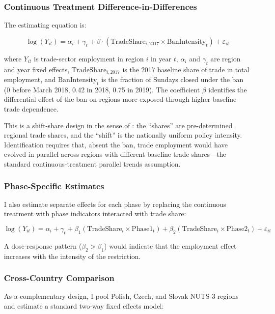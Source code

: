 \documentclass[12pt]{article}
\begin{document}
\subsubsection*{Continuous Treatment Difference-in-Differences} The estimating equation is:

\begin{equation}
\log(Y_{it}) = \alpha_i + \gamma_t + \beta \cdot (\text{TradeShare}_{i,2017} \times \text{BanIntensity}_t) + \varepsilon_{it}
\label{eq:main}
\end{equation}

\noindent where $Y_{it}$ is trade-sector employment in region $i$ in year $t$, $\alpha_i$ and $\gamma_t$ are region and year fixed effects, $\text{TradeShare}_{i,2017}$ is the 2017 baseline share of trade in total employment, and $\text{BanIntensity}_t$ is the fraction of Sundays closed under the ban (0 before March 2018, 0.42 in 2018, 0.75 in 2019). The coefficient $\beta$ identifies the differential effect of the ban on regions more exposed through higher baseline trade dependence.

This is a shift-share design in the sense of \citet{BorusyakHullJaravelEconometrica2022}: the ``shares'' are pre-determined regional trade shares, and the ``shift'' is the nationally uniform policy intensity. Identification requires that, absent the ban, trade employment would have evolved in parallel across regions with different baseline trade shares---the standard continuous-treatment parallel trends assumption.

\subsubsection*{Phase-Specific Estimates} I also estimate separate effects for each phase by replacing the continuous treatment with phase indicators interacted with trade share:

\begin{equation}
\log(Y_{it}) = \alpha_i + \gamma_t + \beta_1 (\text{TradeShare}_i \times \text{Phase1}_t) + \beta_2 (\text{TradeShare}_i \times \text{Phase2}_t) + \varepsilon_{it}
\label{eq:phase}
\end{equation}

A dose-response pattern ($\beta_2 > \beta_1$) would indicate that the employment effect increases with the intensity of the restriction.

\subsubsection*{Cross-Country Comparison} As a complementary design, I pool Polish, Czech, and Slovak NUTS-3 regions and estimate a standard two-way fixed effects model:
\end{document}
